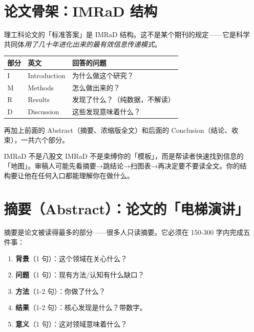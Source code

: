 \documentclass[12pt,a4paper]{ctexart}
\begin{document}
\section{论文骨架：IMRaD 结构}

理工科论文的「标准答案」是 IMRaD 结构。这不是某个期刊的规定——它是科学共同体\emph{用了几十年进化出来的最有效信息传递模式}。

\begin{center}
\begin{tabular}{lll}
\toprule
\textbf{部分}   & \textbf{英文}           & \textbf{回答的问题}           \\
\midrule
I    & Introduction         & 为什么做这个研究？           \\
M    & Methods              & 怎么做出来的？               \\
R    & Results              & 发现了什么？（纯数据，不解读） \\
D    & Discussion           & 这些发现意味着什么？         \\
\bottomrule
\end{tabular}
\end{center}

\noindent 再加上前面的 Abstract（摘要、浓缩版全文）和后面的 Conclusion（结论、收束），一共六个部分。

\begin{writingtip}{IMRaD 不是八股文}
    IMRaD 不是束缚你的「模板」，而是帮读者快速找到信息的「地图」。审稿人可能先看摘要→跳结论→扫图表→再决定要不要读全文。你的结构要让他在任何入口都能理解你在做什么。
\end{writingtip}


\section{摘要（Abstract）：论文的「电梯演讲」}

摘要是论文被读得最多的部分——很多人只读摘要。它必须在 150-300 字内完成五件事：

\begin{enumerate}[label=(\arabic*),leftmargin=*]
    \item \textbf{背景}（1 句）：这个领域在关心什么？
    \item \textbf{问题}（1 句）：现有方法/认知有什么缺口？
    \item \textbf{方法}（1-2 句）：你做了什么？
    \item \textbf{结果}（1-2 句）：核心发现是什么？带数字。
    \item \textbf{意义}（1 句）：这对领域意味着什么？
\end{enumerate}
\end{document}
